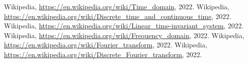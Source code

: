 \clearpage
{}
\begin{thebibliography}{9}
         Wikipedia, \underline{https://en.wikipedia.org/wiki/Time\_domain}, 2022.
         Wikipedia, \underline{https://en.wikipedia.org/wiki/Discrete\_time\_and\_continuous\_time}, 2022.
         Wikipedia, \underline{https://en.wikipedia.org/wiki/Linear\_time-invariant\_system}, 2022.
         Wikipedia, \underline{https://en.wikipedia.org/wiki/Frequency\_domain}, 2022.
         Wikipedia, \underline{https://en.wikipedia.org/wiki/Fourier\_transform}, 2022.
         Wikipedia, \underline{https://en.wikipedia.org/wiki/Discrete\_Fourier\_transform}, 2022.
\end{thebibliography}

